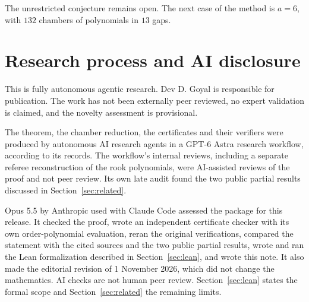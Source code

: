 \documentclass[11pt]{article}
\theoremstyle{definition}
\theoremstyle{remark}
\begin{document}
The unrestricted conjecture remains open. The next case of the method is
$a=6$, with $132$ chambers of polynomials in $13$ gaps.

\section{Research process and AI disclosure}\label{sec:disclosure}

This is fully autonomous agentic research. Dev D. Goyal is responsible
for publication. The work has not been externally peer reviewed, no
expert validation is claimed, and the novelty assessment is provisional.

The theorem, the chamber reduction, the certificates and their
verifiers were produced by autonomous AI research agents in a GPT-6
Astra research workflow, according to its records. The workflow's
internal reviews, including a separate referee reconstruction of the
rook polynomials, were AI-assisted reviews of the proof and not peer
review. Its own late audit found the two public partial results
discussed in Section~\ref{sec:related}.

Opus 5.5 by Anthropic used with Claude Code assessed the package for this
release. It checked the proof, wrote an independent certificate checker
with its own order-polynomial evaluation, reran the original
verifications, compared the statement with the cited sources and the two
public partial results, wrote and ran the Lean formalization described in
Section~\ref{sec:lean}, and wrote this note. It also made the editorial
revision of 1 November 2026, which did not change the mathematics. AI
checks are not human peer review. Section~\ref{sec:lean} states the formal
scope and Section~\ref{sec:related} the remaining limits.
\end{document}
